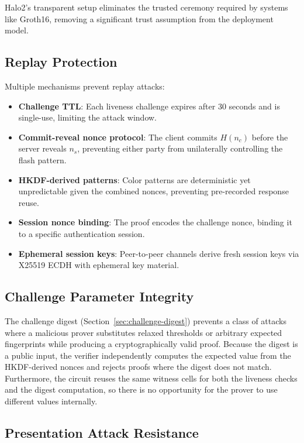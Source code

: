 \documentclass[conference]{IEEEtran}
\begin{document}
Halo2's transparent setup eliminates the trusted ceremony required by systems like Groth16, removing a significant trust assumption from the deployment model.

\subsection{Replay Protection}

Multiple mechanisms prevent replay attacks:

\begin{itemize}
\item \textbf{Challenge TTL}: Each liveness challenge expires after 30 seconds and is single-use, limiting the attack window.
\item \textbf{Commit-reveal nonce protocol}: The client commits $H(n_c)$ before the server reveals $n_s$, preventing either party from unilaterally controlling the flash pattern.
\item \textbf{HKDF-derived patterns}: Color patterns are deterministic yet unpredictable given the combined nonces, preventing pre-recorded response reuse.
\item \textbf{Session nonce binding}: The proof encodes the challenge nonce, binding it to a specific authentication session.
\item \textbf{Ephemeral session keys}: Peer-to-peer channels derive fresh session keys via X25519 ECDH with ephemeral key material.
\end{itemize}

\subsection{Challenge Parameter Integrity}

The challenge digest (Section~\ref{sec:challenge-digest}) prevents a class of attacks where a malicious prover substitutes relaxed thresholds or arbitrary expected fingerprints while producing a cryptographically valid proof. Because the digest is a public input, the verifier independently computes the expected value from the HKDF-derived nonces and rejects proofs where the digest does not match. Furthermore, the circuit reuses the same witness cells for both the liveness checks and the digest computation, so there is no opportunity for the prover to use different values internally.

\subsection{Presentation Attack Resistance}
\end{document}
